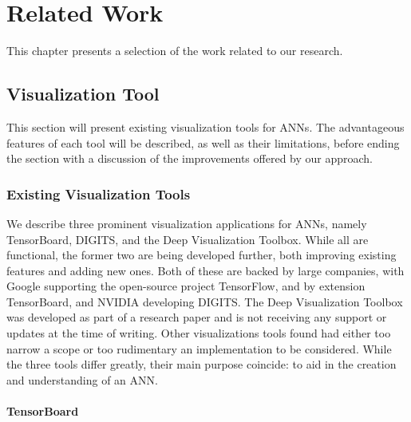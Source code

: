 
\chapter{Related Work}

This chapter presents a selection of the work related to our research.

\section{Visualization Tool}


This section will present existing visualization tools for ANNs. The advantageous features of each tool will be described, as well as their limitations, before ending the section with a discussion of the improvements offered by our approach. 

\subsection{Existing Visualization Tools}

We describe three prominent visualization applications for ANNs, namely TensorBoard, DIGITS, and the Deep Visualization Toolbox. While all are functional, the former two are being developed further, both improving existing features and adding new ones. Both of these are backed by large companies, with Google supporting the open-source project TensorFlow, and by extension TensorBoard, and NVIDIA developing DIGITS. The Deep Visualization Toolbox was developed as part of a research paper and is not receiving any support or updates at the time of writing. Other visualizations tools found had either too narrow a scope or too rudimentary an implementation to be considered. While the three tools differ greatly, their main purpose coincide: to aid in the creation and understanding of an ANN.

\subsubsection{TensorBoard}

